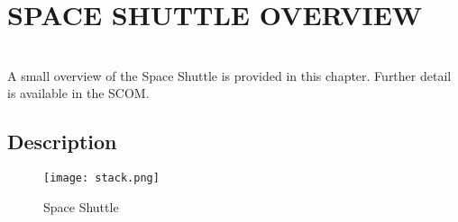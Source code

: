 \documentclass[Space_Shuttle_Vessel_Manual.tex]{subfiles}
\begin{document}
\section{SPACE SHUTTLE OVERVIEW}
\begin{multicols*}{2}
\label{sec:space-shuttle-overview}
\renewcommand{\cfttoctitlefont}{\bf}
\localtableofcontents
\noindent
\\
A small overview of the Space Shuttle is provided in this chapter. Further detail is available in the SCOM.
\end{multicols*} 

\subsection{Description}
\begin{figure}[b!]
  \texttt{[image: stack.png]}
  \caption{Space Shuttle}
  \label{fig:stack}
\end{figure}
\end{document}
